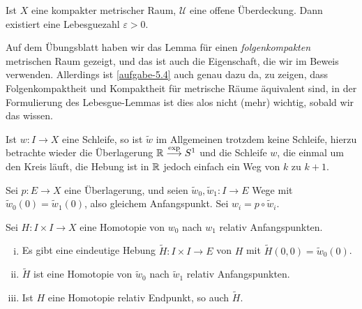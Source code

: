 \begin{lemma*}\label{lm:lebesgue}
    Ist $X$ eine kompakter metrischer Raum,  $\mathcal{U}$ eine offene Überdeckung. Dann existiert eine Lebesguezahl $ε>0$.
\end{lemma*}

\begin{remark*}
    Auf dem Übungsblatt haben wir das Lemma für einen \textit{folgenkompakten} metrischen Raum gezeigt, und das ist auch die Eigenschaft, die wir im Beweis verwenden. Allerdings ist \autoref{aufgabe-5.4} auch genau dazu da, zu zeigen, dass Folgenkompaktheit und Kompaktheit für metrische Räume äquivalent sind, in der Formulierung des Lebesgue-Lemmas ist dies alos nicht (mehr) wichtig, sobald wir das wissen.
\end{remark*}

\begin{remark}
    Ist $w\colon  I \to  X$ eine Schleife, so ist $\tilde{w}$ im Allgemeinen trotzdem keine Schleife, hierzu betrachte wieder die Überlagerung $\mathbb{R} \stackrel{\exp }{\longrightarrow} S^1$ und die Schleife $w$, die einmal um den Kreis läuft, die Hebung ist in $\mathbb{R}$ jedoch einfach ein Weg von $k$ zu $k+1$.


    \begin{minipage}{\textwidth}
    \centering
    \label{fig:hebung-von-schleife-zu-weg}
    \end{minipage}
\end{remark}

\begin{theorem}[Homotopieliftungssatz]\label{thm:homotopieliftungssatz}
    Sei $p\colon  E \to  X$ eine Überlagerung, und seien $\tilde{w}_0, \tilde{w}_1\colon  I \to  E$ Wege mit $\tilde{w}_0(0) = \tilde{w}_1(0)$, also gleichem Anfangspunkt. Sei $w_i = p \circ  \tilde{w}_i$.

    Sei $H\colon  I \times I \to  X$ eine Homotopie von $w_0$ nach $w_1$ relativ Anfangspunkten.

    \begin{enumerate}[i)]
        \item Es gibt eine eindeutige Hebung $\tilde{H}\colon  I \times I \to  E$ von $H$ mit  $\tilde{H}(0,0) = \tilde{w}_0(0)$.
        \item $\tilde{H}$ ist eine Homotopie von $\tilde{w}_0$ nach $\tilde{w}_1$ relativ Anfangspunkten.
        \item Ist $H$ eine Homotopie relativ Endpunkt, so auch  $\tilde{H}$.
    \end{enumerate}
\end{theorem}


